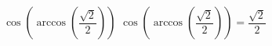  {$\cos\left(\arccos\left(\dfrac{\sqrt{2}}{2}\right)\right)$}
{ $\cos\left(\arccos\left(\dfrac{\sqrt{2}}{2}\right)\right) = \dfrac{\sqrt{2}}{2}$}

